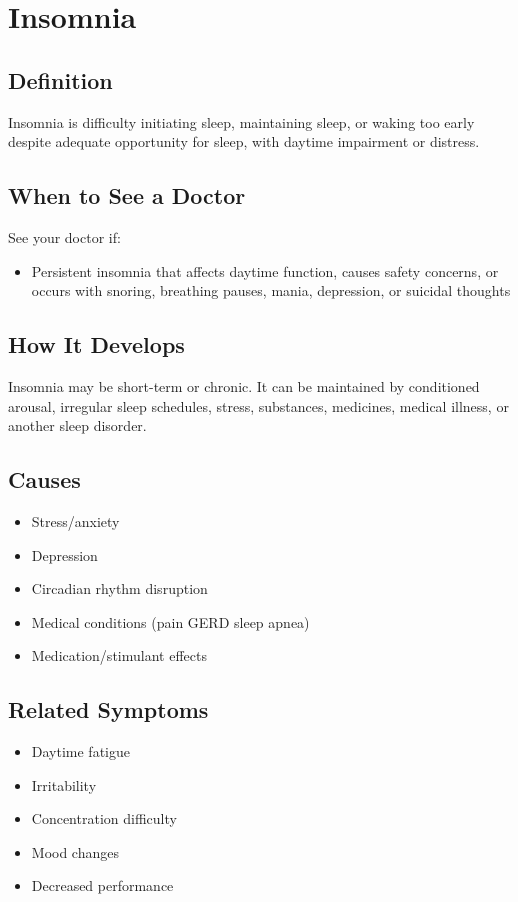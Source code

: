 \chapter{Insomnia}

\section*{Definition}
Insomnia is difficulty initiating sleep, maintaining sleep, or waking too early despite adequate opportunity for sleep, with daytime impairment or distress.

\section*{When to See a Doctor}
See your doctor if:
\begin{itemize}
  \item Persistent insomnia that affects daytime function, causes safety concerns, or occurs with snoring, breathing pauses, mania, depression, or suicidal thoughts
\end{itemize}

\section*{How It Develops}
Insomnia may be short-term or chronic. It can be maintained by conditioned arousal, irregular sleep schedules, stress, substances, medicines, medical illness, or another sleep disorder.

\section*{Causes}
\begin{itemize}
  \item Stress/anxiety
  \item Depression
  \item Circadian rhythm disruption
  \item Medical conditions (pain GERD sleep apnea)
  \item Medication/stimulant effects
\end{itemize}

\section*{Related Symptoms}
\begin{itemize}
  \item Daytime fatigue
  \item Irritability
  \item Concentration difficulty
  \item Mood changes
  \item Decreased performance
\end{itemize}


